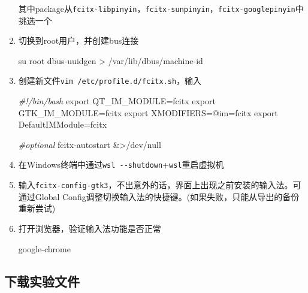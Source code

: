 \documentclass{article}
\newenvironment{Shaded}{}{}
\newcommand{\BuiltInTok}[1]{\textcolor[rgb]{0.00,0.50,0.00}{#1}}
\newcommand{\CommentTok}[1]{\textcolor[rgb]{0.38,0.63,0.69}{\textit{#1}}}
\newcommand{\ExtensionTok}[1]{#1}
\newcommand{\FunctionTok}[1]{\textcolor[rgb]{0.02,0.16,0.49}{#1}}
\newcommand{\NormalTok}[1]{#1}
\newcommand{\OperatorTok}[1]{\textcolor[rgb]{0.40,0.40,0.40}{#1}}
\newcommand{\VariableTok}[1]{\textcolor[rgb]{0.10,0.09,0.49}{#1}}
\begin{document}
\begin{enumerate}
        其中package从\texttt{fcitx-libpinyin}，\texttt{fcitx-sunpinyin}，\texttt{fcitx-googlepinyin}中挑选一个
  \item
        切换到root用户，并创建bus连接

        \begin{Shaded}
          \begin{Highlighting}[]
            \FunctionTok{su}\NormalTok{ root}
            \ExtensionTok{dbus{-}uuidgen} \OperatorTok{\textgreater{}}\NormalTok{ /var/lib/dbus/machine{-}id}
          \end{Highlighting}
        \end{Shaded}
  \item
        创建新文件\texttt{vim\ /etc/profile.d/fcitx.sh}，输入

        \begin{Shaded}
          \begin{Highlighting}[]
            \CommentTok{\#!/bin/bash}
            \BuiltInTok{export} \VariableTok{QT\_IM\_MODULE}\OperatorTok{=}\NormalTok{fcitx}
            \BuiltInTok{export} \VariableTok{GTK\_IM\_MODULE}\OperatorTok{=}\NormalTok{fcitx}
            \BuiltInTok{export} \VariableTok{XMODIFIERS}\OperatorTok{=}\NormalTok{@im=fcitx}
            \BuiltInTok{export} \VariableTok{DefaultIMModule}\OperatorTok{=}\NormalTok{fcitx}

            \CommentTok{\#optional}
            \ExtensionTok{fcitx{-}autostart} \OperatorTok{\&\textgreater{}}\NormalTok{/dev/null}
          \end{Highlighting}
        \end{Shaded}
  \item
        在Windows终端中通过\texttt{wsl\ -\/-shutdown}+\texttt{wsl}重启虚拟机
  \item
        输入\texttt{fcitx-config-gtk3}，不出意外的话，界面上出现之前安装的输入法。可通过Global
        Config调整切换输入法的快捷键。(如果失败，只能从导出的备份重新尝试)
  \item
        打开浏览器，验证输入法功能是否正常

        \begin{Shaded}
          \begin{Highlighting}[]
            \NormalTok{google{-}chrome}
          \end{Highlighting}
        \end{Shaded}
\end{enumerate}

\subsection{下载实验文件}\label{ux4e0bux8f7dux5b9eux9a8cux6587ux4ef6}
\end{document}
